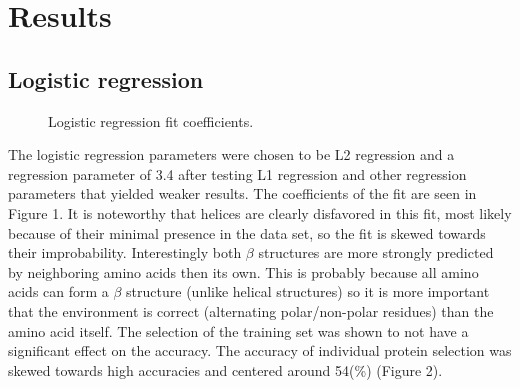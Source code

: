 \documentclass{article}
\begin{document}
\section{Results}

\subsection{Logistic regression}

\begin{figure}[h]
  \centering
  \caption{Logistic regression fit coefficients.}
\end{figure}

The logistic regression parameters were chosen to be L2 regression and a regression parameter of 3.4 after testing L1 regression and other regression parameters that yielded weaker results. The coefficients of the fit are seen in Figure 1. It is noteworthy that  helices are clearly disfavored in this fit, most likely because of their minimal presence in the data set, so the fit is skewed towards their improbability. Interestingly both $\beta$ structures are more strongly predicted by neighboring amino acids then its own. This is probably because all amino acids can form a $\beta$ structure (unlike helical structures) so it is more important that the environment is correct (alternating polar/non-polar residues) than the amino acid itself. The selection of the training set was shown to not have a significant effect on the accuracy. The accuracy of individual protein selection was skewed towards high accuracies and centered around 54(\%) (Figure 2).
\end{document}
